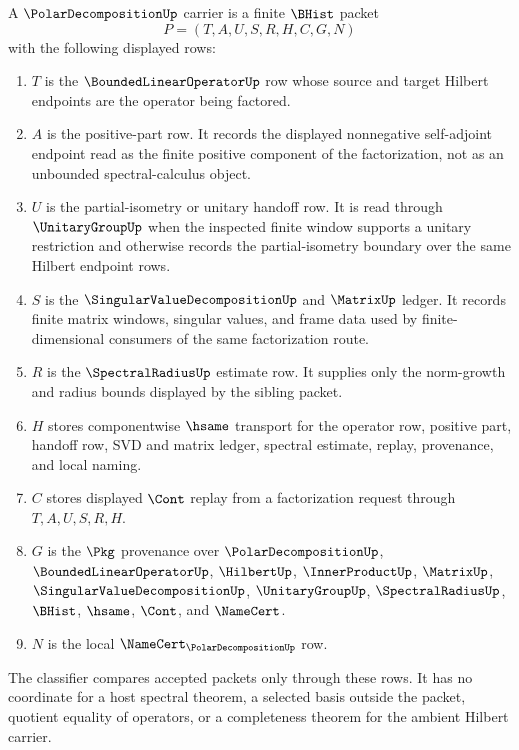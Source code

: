 \begin{definition}
\label{def:polar-decomposition-carrier}
A $\PolarDecompositionUp$ carrier is a finite $\BHist$ packet
$$
P=(T,A,U,S,R,H,C,G,N)
$$
with the following displayed rows:
\begin{enumerate}
\item $T$ is the $\BoundedLinearOperatorUp$ row whose source and target Hilbert endpoints are the operator being factored.
\item $A$ is the positive-part row. It records the displayed nonnegative self-adjoint endpoint read as the finite positive component of the factorization, not as an unbounded spectral-calculus object.
\item $U$ is the partial-isometry or unitary handoff row. It is read through $\UnitaryGroupUp$ when the inspected finite window supports a unitary restriction and otherwise records the partial-isometry boundary over the same Hilbert endpoint rows.
\item $S$ is the $\SingularValueDecompositionUp$ and $\MatrixUp$ ledger. It records finite matrix windows, singular values, and frame data used by finite-dimensional consumers of the same factorization route.
\item $R$ is the $\SpectralRadiusUp$ estimate row. It supplies only the norm-growth and radius bounds displayed by the sibling packet.
\item $H$ stores componentwise $\hsame$ transport for the operator row, positive part, handoff row, SVD and matrix ledger, spectral estimate, replay, provenance, and local naming.
\item $C$ stores displayed $\Cont$ replay from a factorization request through $T,A,U,S,R,H$.
\item $G$ is the $\Pkg$ provenance over $\PolarDecompositionUp$, $\BoundedLinearOperatorUp$, $\HilbertUp$, $\InnerProductUp$, $\MatrixUp$, $\SingularValueDecompositionUp$, $\UnitaryGroupUp$, $\SpectralRadiusUp$, $\BHist$, $\hsame$, $\Cont$, and $\NameCert$.
\item $N$ is the local $\NameCert_{\PolarDecompositionUp}$ row.
\end{enumerate}
The classifier compares accepted packets only through these rows. It has no coordinate for a host spectral theorem, a selected basis outside the packet, quotient equality of operators, or a completeness theorem for the ambient Hilbert carrier.
\end{definition}

